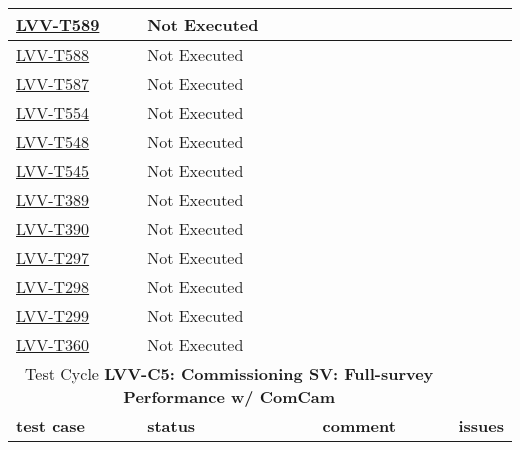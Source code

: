 \documentclass[DM,lsstdraft,STR,toc]{lsstdoc}
\begin{document}
\begin{longtable}{p{}p{}p{}p{}}
    \\\hline
    \href{https://jira.lsstcorp.org/secure/Tests.jspa#/testCase/LVV-T589}{LVV-T589}
    & Not Executed &  &
    \\\hline
    \href{https://jira.lsstcorp.org/secure/Tests.jspa#/testCase/LVV-T588}{LVV-T588}
    & Not Executed &  &
    \\\hline
    \href{https://jira.lsstcorp.org/secure/Tests.jspa#/testCase/LVV-T587}{LVV-T587}
    & Not Executed &  &
    \\\hline
    \href{https://jira.lsstcorp.org/secure/Tests.jspa#/testCase/LVV-T554}{LVV-T554}
    & Not Executed &  &
    \\\hline
    \href{https://jira.lsstcorp.org/secure/Tests.jspa#/testCase/LVV-T548}{LVV-T548}
    & Not Executed &  &
    \\\hline
    \href{https://jira.lsstcorp.org/secure/Tests.jspa#/testCase/LVV-T545}{LVV-T545}
    & Not Executed &  &
    \\\hline
    \href{https://jira.lsstcorp.org/secure/Tests.jspa#/testCase/LVV-T389}{LVV-T389}
    & Not Executed &  &
    \\\hline
    \href{https://jira.lsstcorp.org/secure/Tests.jspa#/testCase/LVV-T390}{LVV-T390}
    & Not Executed &  &
    \\\hline
    \href{https://jira.lsstcorp.org/secure/Tests.jspa#/testCase/LVV-T297}{LVV-T297}
    & Not Executed &  &
    \\\hline
    \href{https://jira.lsstcorp.org/secure/Tests.jspa#/testCase/LVV-T298}{LVV-T298}
    & Not Executed &  &
    \\\hline
    \href{https://jira.lsstcorp.org/secure/Tests.jspa#/testCase/LVV-T299}{LVV-T299}
    & Not Executed &  &
    \\\hline
    \href{https://jira.lsstcorp.org/secure/Tests.jspa#/testCase/LVV-T360}{LVV-T360}
    & Not Executed &  &
    \\\hline

  \multicolumn{3}{c}{ Test Cycle {\bf LVV-C5: Commissioning SV: Full-survey Performance w/ ComCam
 }} \\\hline

  {\bf \footnotesize test case} & {\bf \footnotesize status} & {\bf \footnotesize comment} & {\bf \footnotesize issues} \\\toprule


\end{longtable}
\end{document}

